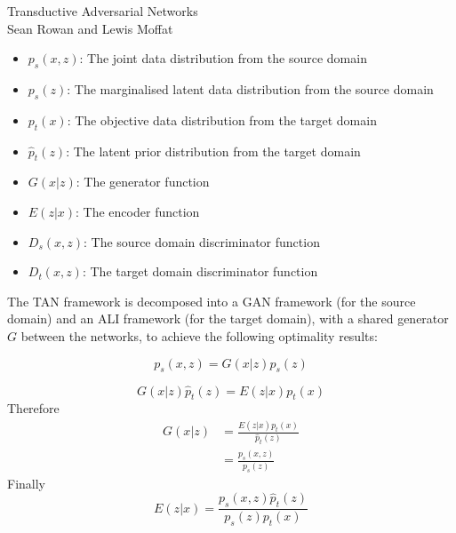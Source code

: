 \documentclass[a4paper,10pt]{article}
\begin{document}
\begin{bf}
\begin{center}
Transductive Adversarial Networks\\
Sean Rowan and Lewis Moffat
\end{center}
\end{bf}

\begin{itemize}
\item $p_s(x,z)$: The joint data distribution from the source domain
\item $p_s(z)$: The marginalised latent data distribution from the source domain
\item $p_t(x)$: The objective data distribution from the target domain
\item $\hat{p}_t(z)$: The latent prior distribution from the target domain
\item $G(x|z)$: The generator function
\item $E(z|x)$: The encoder function
\item $D_s(x,z)$: The source domain discriminator function
\item $D_t(x,z)$: The target domain discriminator function
\end{itemize}

The TAN framework is decomposed into a GAN framework (for the source domain) and an ALI framework (for the target domain), with a shared generator $G$ between the networks, to achieve the following optimality results:

\begin{equation}
p_s(x,z) = G(x|z)p_s(z)
\end{equation}

\begin{equation}
G(x|z)\hat{p}_t(z) = E(z|x)p_t(x)
\end{equation}
Therefore
\begin{equation}
\begin{split}
G(x|z) &= \frac{E(z|x)p_t(x)}{\hat{p}_t(z)}\\
&= \frac{p_s(x,z)}{p_s(z)}
\end{split}
\end{equation}
Finally
\begin{equation}
E(z|x) = \frac{p_s(x,z)\hat{p}_t(z)}{p_s(z)p_t(x)}
\end{equation}
\end{document}
